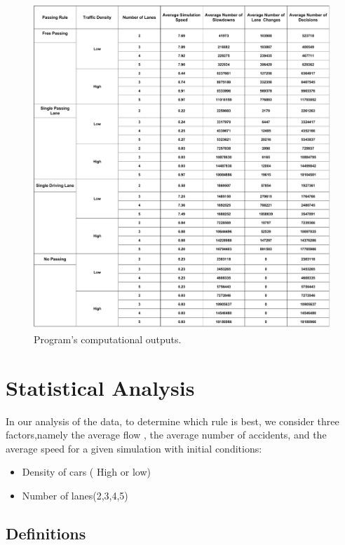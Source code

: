 \documentclass{amsart}
\begin{document}
\begin{figure}[H]
	\begin{center}
	\includegraphics[scale=0.3]{MCMDataSummary}
	\caption{Program's computational outputs.}
	\renewcommand{\figurename}{}
	\end{center}
	\end{figure}

\section{\bfseries{Statistical Analysis}}
	In our analysis of the data, to determine which rule is best, we consider three factors,namely the average flow , the average number of accidents, and the average speed for a given simulation with initial conditions:
	\begin{itemize}
		\item Density of cars ( High or low)
		\item Number of lanes(2,3,4,5)
	\end{itemize}
	
	\subsection{Definitions}
\end{document}
